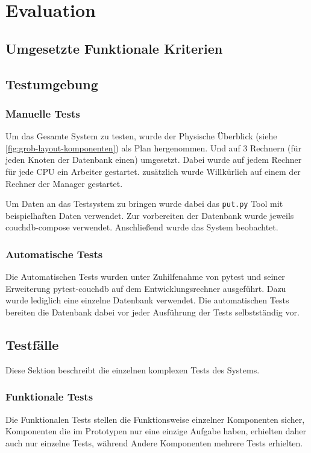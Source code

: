 \chapter{Evaluation}
\section{Umgesetzte Funktionale Kriterien}



\section{Testumgebung}


\subsection{Manuelle Tests}
Um das Gesamte System zu testen, wurde der Physische Überblick (siehe \cref{fig:grob-layout-komponenten}) als Plan hergenommen.
Und auf 3 Rechnern (für jeden Knoten der Datenbank einen) umgesetzt.
Dabei wurde auf jedem Rechner für jede CPU ein Arbeiter gestartet.
zusätzlich wurde Willkürlich auf einem der Rechner der Manager gestartet.

Um Daten an das Testsystem zu bringen wurde dabei das \verb|put.py| Tool mit beispielhaften Daten verwendet.
Zur vorbereiten der Datenbank wurde jeweils couchdb-compose \cite{couchdb:compose} verwendet.
Anschließend wurde das System beobachtet.

\subsection{Automatische Tests}
Die Automatischen Tests wurden unter Zuhilfenahme von pytest \cite{pytest:website} und seiner Erweiterung  pytest-couchdb \cite{pytest:couchdbkit} auf dem Entwicklungsrechner  ausgeführt.
Dazu wurde lediglich eine einzelne Datenbank verwendet.
Die automatischen Tests bereiten die Datenbank dabei vor jeder Ausführung der Tests selbstständig vor.

\section{Testfälle}


Diese Sektion beschreibt die einzelnen komplexen Tests des Systems.

\subsection{Funktionale Tests}
Die Funktionalen Tests stellen die Funktionsweise einzelner Komponenten sicher,
Komponenten die im Prototypen nur eine einzige Aufgabe haben,
erhielten daher auch nur einzelne Tests, während Andere Komponenten mehrere Tests erhielten.

